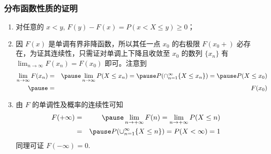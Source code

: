 \begin{frame}
	\frametitle{分布函数性质的证明}
	\begin{enumerate}[<+-|alert@+>]
		\item 对任意的 $x<y$, $F (y)-F (x)=P (x< X\le y)\ge 0$；
		\item 因 $F (x)$ 是单调有界非降函数，所以其任一点 $x_0$ 的右极限 $F (x_0+)$ 必存在，为证其连续性，只需证对单调上下降且收敛至 $x_0$ 的数列 $\{x_n\}$ 有 $\lim_{n\rightarrow\infty} F (x_n)=F (x_0)$ 即可。注意到
		      \begin{eqnarray*}
			      \lim_{n\rightarrow\infty}F(x_n)&=&\pause \lim_{n\rightarrow\infty}P(X\le x_n)=\pause P(\cap_{n=1}^\infty \{X\le x_n\})=\pause P(X\le x_0)\\\pause
			      &=&F(x_0)
		      \end{eqnarray*}


		\item 由 $F$ 的单调性及概率的连续性可知
		      \begin{eqnarray*}
			      F(+\infty)&=&\pause \lim_{n\rightarrow +\infty}F(n)=\lim_{n\rightarrow +\infty}P(X\le n)\\
			      &=&\pause P(\cup_{n=1}^\infty \{X\le n\})=P(X<\infty)=1
		      \end{eqnarray*}
		      \pause  同理可证 $F (-\infty)=0$.

	\end{enumerate}


\end{frame}


